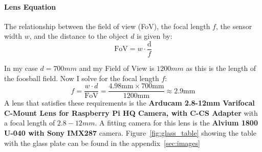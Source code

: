 \paragraph{Lens Equation}\label{par:lens_equation}

The relationship between the field of view (FoV), the focal length $f$, the sensor width $w$, and the distance to the object $d$ is given by:
\begin{equation}
    \text{FoV} = w \cdot \frac{\text{d}}{f}\label{eq:lens_equation}
\end{equation}


\noindent In my case $d = 700mm$ and my Field of View is $1200mm$ as this is the length of the foosball field.
Now I solve for the focal length $f$:
\begin{equation}
    \label{eq:focal_length}
    f = \frac{w \cdot d}{\text{FoV}} = \frac{4.98\text{mm} \times 700\text{mm}}{1200\text{mm}} \approx 2.9\text{mm}
\end{equation}
A lens that satisfies these requirements is the \textbf{Arducam 2.8-12mm Varifocal C-Mount Lens for Raspberry Pi HQ Camera, with C-CS Adapter\autocite{arducam-lens}} with a focal length of $2.8-12mm$.
A fitting camera for this lens is the \textbf{Alvium 1800 U-040 with Sony IMX287}\autocite{allied-vision-lens} camera.
Figure~\ref{fig:glass_table} showing the table with the glass plate can be found in the appendix~\ref{sec:images}